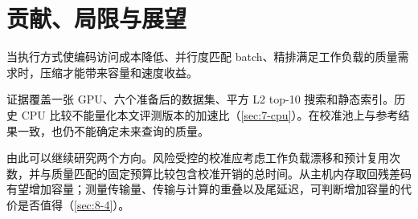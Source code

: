 \section{贡献、局限与展望}
\label{sec:9-2}

当执行方式使编码访问成本降低、并行度匹配 batch、精排满足工作负载的质量需求时，压缩才能带来容量和速度收益。

证据覆盖一张 GPU、六个准备后的数据集、平方 L2 top-10 搜索和静态索引。历史 CPU 比较不能量化本文评测版本的加速比（\cref{sec:7-cpu}）。在校准池上与参考结果一致，也仍不能确定未来查询的质量。

由此可以继续研究两个方向。风险受控的校准应考虑工作负载漂移和预计复用次数，并与质量匹配的固定预算比较包含校准开销的总时间。从主机内存取回残差码有望增加容量；测量传输量、传输与计算的重叠以及尾延迟，可判断增加容量的代价是否值得（\cref{sec:8-4}）。

